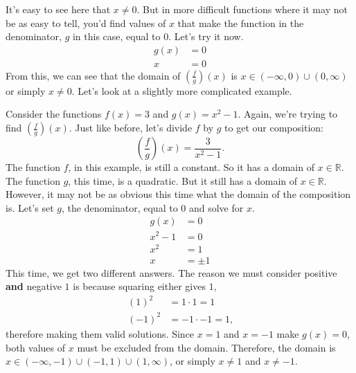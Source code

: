 It's easy to see here that $x \neq 0$. But in more difficult functions where it may not be as easy to tell, you'd find values of $x$ that make the function in the denominator, $g$ in this case, equal to $0$. Let's try it now.
\begin{align*}
g(x) &= 0 \\
x &= 0
\end{align*}
From this, we can see that the domain of $\left(\frac{f}{g} \right)(x)$ is $x \in (-\infty, 0) \cup (0, \infty)$ or simply $x \neq 0$. Let's look at a slightly more complicated example.

Consider the functions $f(x) = 3$ and $g(x) = x^2 - 1$. Again, we're trying to find $\left(\frac{f}{g} \right)(x)$. Just like before, let's divide $f$ by $g$ to get our composition:
\[
\left(\frac{f}{g} \right)(x) = \frac{3}{x^2 - 1} \text{.}
\]
The function $f$, in this example, is still a constant. So it has a domain of $x \in \mathbb{R}$. The function $g$, this time, is a quadratic. But it still has a domain of $x \in \mathbb{R}$. However, it may not be as obvious this time what the domain of the composition is. Let's set $g$, the denominator, equal to $0$ and solve for $x$.
\begin{align*}
g(x) &= 0 \\
x^2 - 1 &= 0 \\
x^2 &= 1 \\
x &= \pm 1
\end{align*}\clearpage
This time, we get two different answers. The reason we must consider positive \textbf{and} negative $1$ is because squaring either gives $1$,
\[
\begin{aligned}
(1)^2 &= 1 \cdot 1 = 1 \\
(-1)^2 &= -1 \cdot -1 = 1 \text{,}
\end{aligned}
\]
therefore making them valid solutions. Since $x = 1$ and $x = -1$ make $g(x) = 0$, both values of $x$ must be excluded from the domain. Therefore, the domain is $x \in (-\infty, -1) \cup (-1, 1) \cup (1, \infty)$, or simply $x \neq 1$ and $x \neq -1$.

